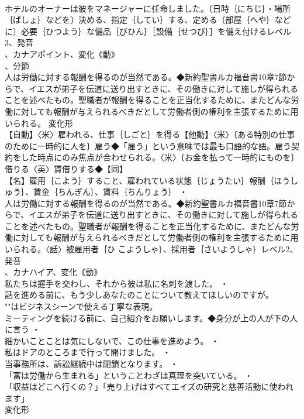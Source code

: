 \documentclass[8pt]{extreport}
\begin{document}
\begin{CJK}{UTF8}{min}
\\	ホテルのオーナーは彼をマネージャーに任命しました。〔日時｛にちじ｝・場所｛ばしょ｝などを〕決める、指定｛してい｝する、定める〔部屋｛へや｝などに〕必要｛ひつよう｝な備品｛びひん｝［設備｛せつび｝］を備え付けるレベル3、発音
\\	、カナアポイント、変化《動》
\\	、分節
\\	人は労働に対する報酬を得るのが当然である。◆新約聖書ルカ福音書10章7節からで、イエスが弟子を伝道に送り出すときに、その働きに対して施しが得られることを述べたもの。聖職者が報酬を得ることを正当化するために、またどんな労働に対しても報酬が与えられるべきだとして労働者側の権利を主張するために用いられる。	変化形 
\\	【自動】〈米〉雇われる、仕事｛しごと｝を得る【他動】〈米〉〔ある特別の仕事のために一時的に人を〕雇う◆「雇う」という意味では最も口語的な語。雇う契約をした時点にのみ焦点が合わせられる。〈米〉〔お金を払って一時的にものを〕借りる〈英〉賃借りする◆【同】
\\	【名】雇用｛こよう｝すること、雇われている状態｛じょうたい｝報酬｛ほうしゅう｝、賃金｛ちんぎん｝、賃料｛ちんりょう｝ ・
\\	人は労働に対する報酬を得るのが当然である。◆新約聖書ルカ福音書10章7節からで、イエスが弟子を伝道に送り出すときに、その働きに対して施しが得られることを述べたもの。聖職者が報酬を得ることを正当化するために、またどんな労働に対しても報酬が与えられるべきだとして労働者側の権利を主張するために用いられる。〈話〉被雇用者｛ひ こようしゃ｝、採用者｛さいようしゃ｝レベル2、発音
\\	、カナハイア、変化《動》
\\	私たちは握手を交わし、それから彼は私に名刺を渡した。 ・
\\	話を進める前に、もう少しあなたのことについて教えてほしいのですが。
\\	""はビジネスシーンで使える丁寧な表現。
\\	ミーティングを続ける前に、自己紹介をお願いします。◆身分が上の人が下の人に言う ・
\\	細かいことことは気にしないで、この仕事を進めよう。 ・
\\	私はドアのところまで行って開けました。 ・
\\	当事務所は、訴訟継続中は閉鎖となります。 ・
\\	「富は労働から生まれる」ということわざは真理を突いている。 ・
\\	「収益はどこへ行くの？」「売り上げはすべてエイズの研究と慈善活動に使われます」
\\	変化形 

\end{CJK}
\end{document}
